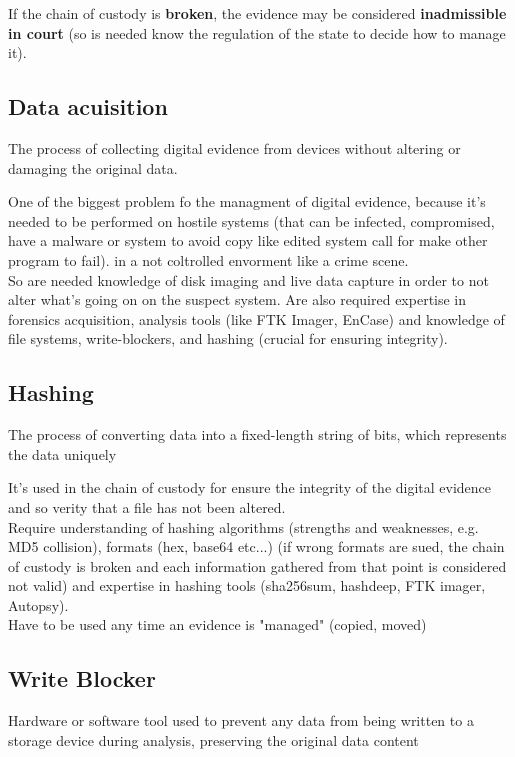 If the chain of custody is \textbf{broken}, the evidence may be considered \textbf{inadmissible in court}
(so is needed know the regulation of the state to decide how to manage it). 

\subsection{Data acuisition}
\begin{boxH}
    The process of collecting digital evidence from devices  
    without altering or damaging the original data.
\end{boxH}

One of the biggest problem fo the managment of digital evidence, because it's needed to be performed
on hostile systems (that can be infected, compromised, have a malware or system to avoid copy
like edited system call for make other program to fail). in a not coltrolled envorment like a crime scene. \\
So are needed knowledge of disk imaging and live data capture in order to not alter what's going on 
on the suspect system. Are also required expertise in forensics acquisition, analysis 
tools (like FTK Imager, EnCase) and knowledge of file systems, write-blockers, and hashing 
(crucial for ensuring integrity).


\subsection{Hashing}
\begin{boxH}
    The process of converting data into a fixed-length string of 
    bits, which represents the data uniquely
\end{boxH}

It's used in the chain of custody for ensure the integrity of the digital evidence and so verity
that a file has not been altered. \\
Require understanding of hashing algorithms (strengths and 
weaknesses, e.g. MD5 collision), formats 
(hex, base64 etc...) (if wrong formats are sued, the chain of custody is broken and each information
gathered from that point is considered not valid) 
and expertise in hashing tools (sha256sum, hashdeep, FTK imager, Autopsy). \\

Have to be used any time an evidence is "managed" (copied, moved)


\subsection{Write Blocker}
\begin{boxH}
    Hardware or software tool used to prevent any data from 
being written to a storage device during analysis, preserving 
the original data content
\end{boxH}

